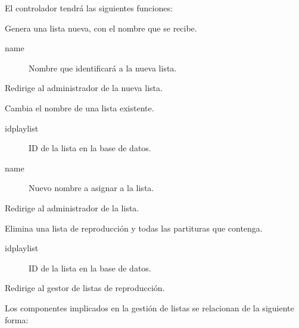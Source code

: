 El controlador tendrá las siguientes funciones:

\begin{description}[style=nextline]
	\item[new\_playlist (name)]
	Genera una lista nueva, con el nombre que se recibe. 
	
	\begin{description}
		\item[name] Nombre que identificará a la nueva lista.
	\end{description}
	
	Redirige al administrador de la nueva lista.
	
	\item[rename\_playlist (idplaylist, name)]
	Cambia el nombre de una lista existente.
	
	\begin{description}
		\item[idplaylist] ID de la lista en la base de datos.
		\item[name] Nuevo nombre a asignar a la lista.
	\end{description}
	
	Redirige al administrador de la lista.
	
	\item[delete\_playlist (idplaylist)]
	Elimina una lista de reproducción y todas las partituras que contenga.
	
	\begin{description}
		\item[idplaylist] ID de la lista en la base de datos.
	\end{description}
	
	Redirige al gestor de listas de reproducción.
	
\end{description}

Los componentes implicados en la gestión de listas se relacionan de la siguiente forma:

\smallskip

